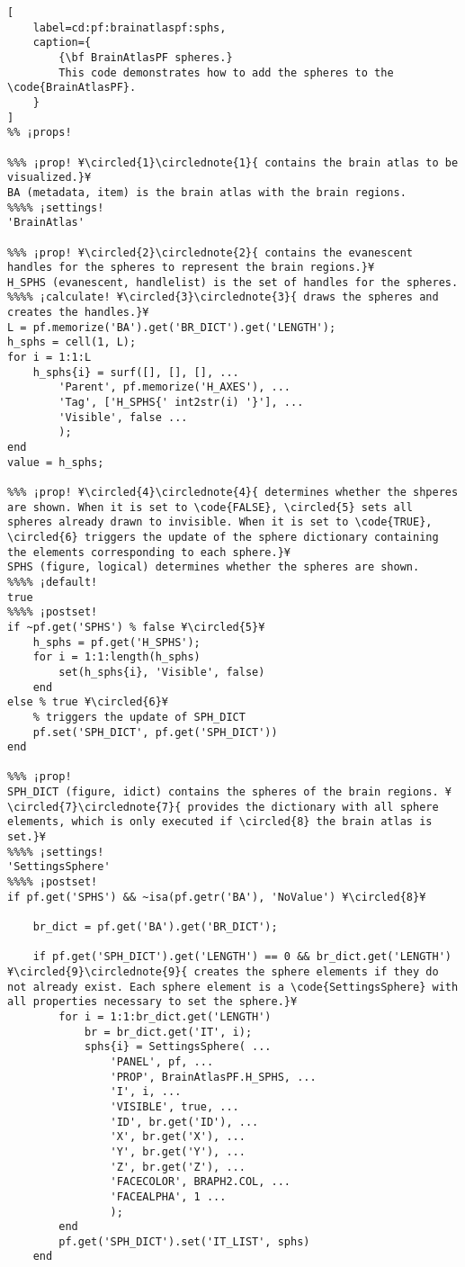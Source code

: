 \documentclass{tufte-handout}
\begin{document}
\begin{lstlisting}[
	label=cd:pf:brainatlaspf:sphs,
	caption={
		{\bf BrainAtlasPF spheres.}
		This code demonstrates how to add the spheres to the \code{BrainAtlasPF}.
	}
]
%% ¡props!

%%% ¡prop! ¥\circled{1}\circlednote{1}{ contains the brain atlas to be visualized.}¥
BA (metadata, item) is the brain atlas with the brain regions.
%%%% ¡settings!
'BrainAtlas'

%%% ¡prop! ¥\circled{2}\circlednote{2}{ contains the evanescent handles for the spheres to represent the brain regions.}¥
H_SPHS (evanescent, handlelist) is the set of handles for the spheres.
%%%% ¡calculate! ¥\circled{3}\circlednote{3}{ draws the spheres and creates the handles.}¥
L = pf.memorize('BA').get('BR_DICT').get('LENGTH');
h_sphs = cell(1, L);
for i = 1:1:L
    h_sphs{i} = surf([], [], [], ...
        'Parent', pf.memorize('H_AXES'), ...
        'Tag', ['H_SPHS{' int2str(i) '}'], ...
        'Visible', false ...
        );
end
value = h_sphs;

%%% ¡prop! ¥\circled{4}\circlednote{4}{ determines whether the shperes are shown. When it is set to \code{FALSE}, \circled{5} sets all spheres already drawn to invisible. When it is set to \code{TRUE}, \circled{6} triggers the update of the sphere dictionary containing the elements corresponding to each sphere.}¥
SPHS (figure, logical) determines whether the spheres are shown.
%%%% ¡default!
true
%%%% ¡postset!
if ~pf.get('SPHS') % false ¥\circled{5}¥
    h_sphs = pf.get('H_SPHS');
    for i = 1:1:length(h_sphs)
        set(h_sphs{i}, 'Visible', false)
    end
else % true ¥\circled{6}¥
    % triggers the update of SPH_DICT
    pf.set('SPH_DICT', pf.get('SPH_DICT'))
end

%%% ¡prop!
SPH_DICT (figure, idict) contains the spheres of the brain regions. ¥\circled{7}\circlednote{7}{ provides the dictionary with all sphere elements, which is only executed if \circled{8} the brain atlas is set.}¥
%%%% ¡settings!
'SettingsSphere'
%%%% ¡postset!
if pf.get('SPHS') && ~isa(pf.getr('BA'), 'NoValue') ¥\circled{8}¥
    
    br_dict = pf.get('BA').get('BR_DICT');
    
    if pf.get('SPH_DICT').get('LENGTH') == 0 && br_dict.get('LENGTH') ¥\circled{9}\circlednote{9}{ creates the sphere elements if they do not already exist. Each sphere element is a \code{SettingsSphere} with all properties necessary to set the sphere.}¥
        for i = 1:1:br_dict.get('LENGTH')
            br = br_dict.get('IT', i);
            sphs{i} = SettingsSphere( ...
                'PANEL', pf, ...
                'PROP', BrainAtlasPF.H_SPHS, ...
                'I', i, ...
                'VISIBLE', true, ...
                'ID', br.get('ID'), ...
                'X', br.get('X'), ... 
                'Y', br.get('Y'), ...
                'Z', br.get('Z'), ...
                'FACECOLOR', BRAPH2.COL, ...
                'FACEALPHA', 1 ...
                );
        end
        pf.get('SPH_DICT').set('IT_LIST', sphs)
    end
    

\end{lstlisting}
\end{document}
